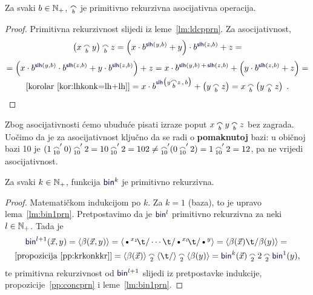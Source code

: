 \begin{propozicija}[{name=[primitivna rekurzivnost i asocijativnost konkatenacije]}]\label{pp:concprn}
Za svaki $b\in{\mathbb N}_+$, $\conc b$ je primitivno rekurzivna asocijativna operacija.
\end{propozicija}
\begin{proof}
Primitivna rekurzivnost slijedi iz leme~\ref{lm:ldcpprn}. Za asocijativnost,
\begin{multline}
    \left(x\conc b y\right)\conc b z=\left(x\cdot b^{\f{slh}(y,b)}+y\right)\cdot b^{\f{slh}(z,b)}+z=\\[1mm]
    =\left(x\cdot b^{\f{slh}(y,b)}\cdot b^{\f{slh}(z,b)}+y\cdot b^{\f{slh}(z,b)}\right)+z=
    x\cdot b^{\f{slh}(y,b)\,+\,\f{slh}(z,b)}+\left(y\cdot b^{\f{slh}(z,b)}+z\right)=\\[-1mm]
    \text{[korolar~\ref{kor:lhkonk=lh+lh}]}{}=x\cdot b^{\f{slh}\bigl(y\conc b z\,,\,b\bigr)}+\left(y\conc b z\right)=x\conc b\left(y\conc b z\right)\text{\qedhere\;.}
\end{multline}
\end{proof}
Zbog asocijativnosti ćemo ubuduće pisati izraze poput $x\conc by\conc bz$ bez zagrada. Uočimo da je za asocijativnost ključno da se radi o \textbf{pomaknutoj} bazi: u običnoj bazi 10 je $(1\conc{10}'0)\conc{10}'2=10\conc{10}'2=102\ne\conc{10}'(0\conc{10}'2)=1\conc{10}'2=12$, pa ne vrijedi asocijativnost.

\begin{propozicija}[{name=[primitivna rekurzivnost višemjesnog binarnog kodiranja]}]\label{pp:binkprn}
Za svaki $k\in{\mathbb N}_+$, funkcija $\f{bin}^k$ je primitivno rekurzivna.
\end{propozicija}
\begin{proof}
Matematičkom indukcijom po $k$. Za $k=1$ (baza), to je upravo lema~\ref{lm:bin1prn}. Pretpostavimo da je $\f{bin}^l$ primitivno rekurzivna za neki $l\in{\mathbb N}_+$. Tada je
\begin{multline}
    \f{bin}^{l+1}(\vec x,y)=
    \kr{\beta(\vec x,y)}=
    \kr{\text\textbullet^{x_1}\!\t/\dotsm\t/\text\textbullet^{x_l}\!\t/\text\textbullet^y}=
    \kr{\beta(\vec x)\t/\beta(y)}={}\\
    \text{[propozicija~\ref{pp:krkonkkr}]}{}=\kr{\beta(\vec x)}\conc 2\kr{\t/}\conc 2\kr{\beta(y)}=
    \f{bin}^k(\vec x)\conc22\conc2\f{bin}^1(y)\text,
\end{multline}
te primitivna rekurzivnost od $\f{bin}^{l+1}$ slijedi iz pretpostavke indukcije, propozicije~\ref{pp:concprn} i leme~\ref{lm:bin1prn}.
\end{proof}

